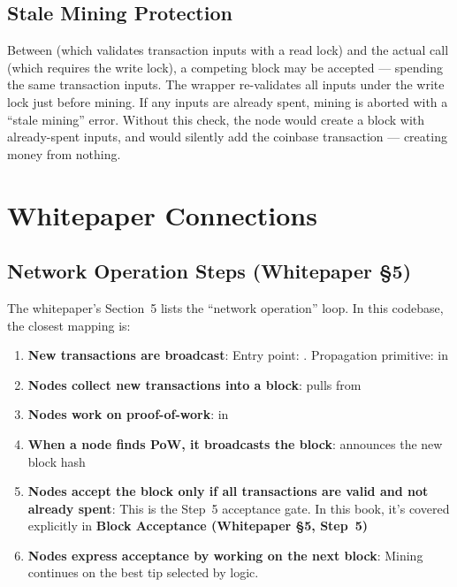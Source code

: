 \subsection{Stale Mining Protection}
\label{sec:ch09-7-stale}

Between  (which validates transaction inputs with a read lock) and the actual  call (which requires the write lock), a competing block may be accepted --- spending the same transaction inputs. The  wrapper re-validates all inputs under the write lock just before mining. If any inputs are already spent, mining is aborted with a ``stale mining'' error. Without this check, the node would create a block with already-spent inputs, and  would silently add the coinbase transaction --- creating money from nothing.

\section{Whitepaper Connections}
\label{sec:ch09-7-whitepaper-connections}

\subsection{Network Operation Steps (Whitepaper \S5)}
\label{sec:ch09-7-network}

The whitepaper's Section~5 lists the ``network operation'' loop. In this codebase, the closest mapping is:

\begin{enumerate}
  \item \textbf{New transactions are broadcast}: Entry point: . Propagation primitive:  in 

  \item \textbf{Nodes collect new transactions into a block}:  pulls from 

  \item \textbf{Nodes work on proof-of-work}:  in 

  \item \textbf{When a node finds PoW, it broadcasts the block}:  announces the new block hash

  \item \textbf{Nodes accept the block only if all transactions are valid and not already spent}: This is the Step~5 acceptance gate. In this book, it's covered explicitly in \textbf{Block Acceptance (Whitepaper \S5, Step~5)}

  \item \textbf{Nodes express acceptance by working on the next block}: Mining continues on the best tip selected by  logic.
\end{enumerate}

